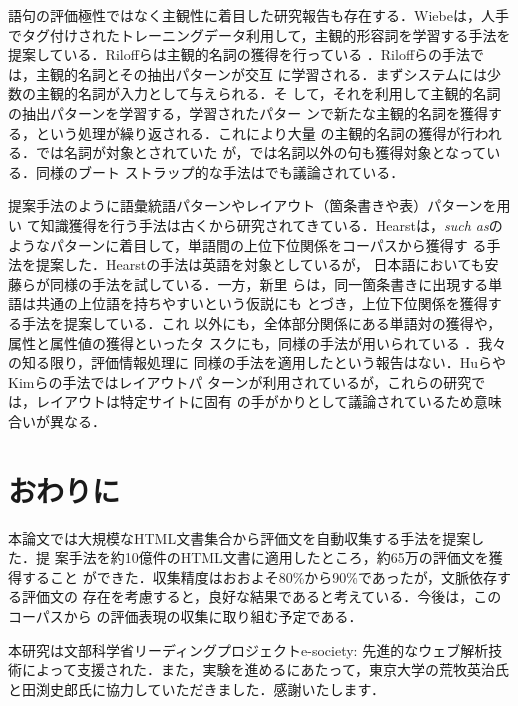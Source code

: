 \documentclass[japanese]{jnlp_1.4}
\begin{document}
語句の評価極性ではなく主観性に着目した研究報告も存在する．Wiebeは，人手
でタグ付けされたトレーニングデータ利用して，主観的形容詞を学習する手法を
提案している\cite{Wiebe00}．Riloffらは主観的名詞の獲得を行っている
\cite{Riloff03a}．Riloffらの手法では，主観的名詞とその抽出パターンが交互
に学習される．まずシステムには少数の主観的名詞が入力として与えられる．そ
して，それを利用して主観的名詞の抽出パターンを学習する，学習されたパター
ンで新たな主観的名詞を獲得する，という処理が繰り返される．これにより大量
の主観的名詞の獲得が行われる．\cite{Riloff03a}では名詞が対象とされていた
が，\cite{Riloff03b}では名詞以外の句も獲得対象となっている．同様のブート
ストラップ的な手法は\cite{Wiebe05}でも議論されている．

提案手法のように語彙統語パターンやレイアウト（箇条書きや表）パターンを用い
て知識獲得を行う手法は古くから研究されてきている．Hearstは，{\it such
as}のようなパターンに着目して，単語間の上位下位関係をコーパスから獲得す
る手法を提案した\cite{Hearst92}．Hearstの手法は英語を対象としているが，
日本語においても安藤らが同様の手法を試している\cite{Ando03}．一方，新里
らは，同一箇条書きに出現する単語は共通の上位語を持ちやすいという仮説にも
とづき，上位下位関係を獲得する手法を提案している\cite{Shinzato05}．これ
以外にも，全体部分関係にある単語対の獲得や，属性と属性値の獲得といったタ
スクにも，同様の手法が用いられている
\cite{Berland99,Chklovski04,Yoshinaga06}．我々の知る限り，評価情報処理に
同様の手法を適用したという報告はない．HuらやKimらの手法ではレイアウトパ
ターンが利用されているが，これらの研究では，レイアウトは特定サイトに固有
の手がかりとして議論されているため意味合いが異なる\cite{Hu05,Kim06}．


\section{おわりに}

本論文では大規模なHTML文書集合から評価文を自動収集する手法を提案した．提
案手法を約10億件のHTML文書に適用したところ，約65万の評価文を獲得すること
ができた．収集精度はおおよそ80\%から90\%であったが，文脈依存する評価文の
存在を考慮すると，良好な結果であると考えている．今後は，このコーパスから
の評価表現の収集に取り組む予定である．

\acknowledgment

本研究は文部科学省リーディングプロジェクトe-society: 先進的なウェブ解析技
術によって支援された．また，実験を進めるにあたって，東京大学の荒牧英治氏
と田渕史郎氏に協力していただきました．感謝いたします．
\end{document}

